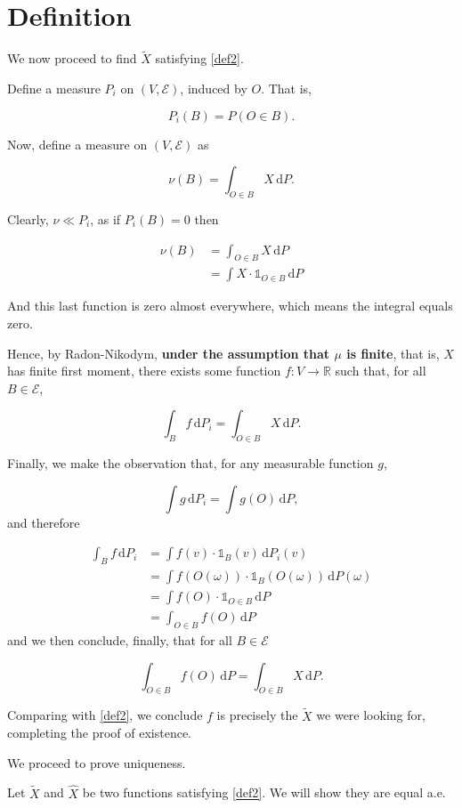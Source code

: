 \documentclass{article}
\let\mathbbalt\mathbb
\let\mathbbu\mathbb
\let\mathbb\mathbbalt
\newcommand{\E}{\mathcal{E}}
\newcommand{\R}{\mathbb{R}}
\newcommand{\dd}{\,\mathrm{d}}
\newcommand{\ind}{\mathbbu{1}}
\begin{document}
	\section{Definition}
	
	We now proceed to find $\tilde X$ satisfying \eqref{def2}.
	
	Define a measure $P_i$ on $(V, \E)$, induced by $O$. That is,
	
	\[P_i(B) = P(O \in B).\]
	
	Now, define a measure on $(V, \E)$ as
	
	\[\nu(B) = \int_{O \in B} X \dd P.\]
	
	Clearly, $\nu \ll P_i$, as if $P_i(B) = 0$ then
	
	\begin{align*}
	\nu(B) &= \int_{O \in B} X \dd P\\
	&= \int X \cdot \ind_{O \in B} \dd P
	\end{align*}
	
	And this last function is zero almost everywhere, which means the integral equals zero.
	
	Hence, by Radon-Nikodym, \textbf{under the assumption that $\mu$ is finite}, that is, $X$ has finite first moment, there exists some function $f : V \to \R$ such that, for all $B \in \E$,
	
	\[\int_B f \dd P_i = \int_{O \in B} X \dd P.\]
	
	Finally, we make the observation that, for any measurable function $g$,
	
	\[\int g \dd P_i = \int g(O) \dd P,\]
	and therefore
	
	\begin{align*}
	\int_B f \dd P_i &= \int f(v) \cdot \ind_B(v) \dd P_i(v)\\
	&= \int f(O(\omega)) \cdot \ind_B(O(\omega)) \dd P(\omega)\\
	&= \int f(O) \cdot \ind_{O \in B} \dd P\\
	&= \int_{O \in B} f(O) \dd P
	\end{align*}
	and we then conclude, finally, that for all $B \in \E$
	
	\[\int_{O \in B} f(O) \dd P = \int_{O \in B} X \dd P.\]
	
	Comparing with \eqref{def2}, we conclude $f$ is precisely the $\tilde X$ we were looking for, completing the proof of existence.
	
	We proceed to prove uniqueness.
	
	Let $\tilde X$ and $\hat X$ be two functions satisfying \eqref{def2}. We will show they are equal a.e.
	
\end{document}
